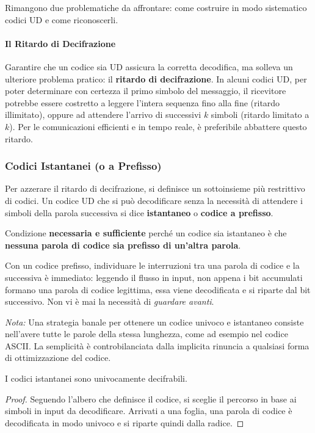 Rimangono due problematiche da affrontare: come costruire in modo sistematico codici UD e come riconoscerli.

\paragraph*{Il Ritardo di Decifrazione}
Garantire che un codice sia UD assicura la corretta decodifica, ma solleva un ulteriore problema pratico: il \textbf{ritardo di decifrazione}. In alcuni codici UD, per poter determinare con certezza il primo simbolo del messaggio, il ricevitore potrebbe essere costretto a leggere l'intera sequenza fino alla fine (ritardo illimitato), oppure ad attendere l'arrivo di successivi $k$ simboli (ritardo limitato a $k$). Per le comunicazioni efficienti e in tempo reale, è preferibile abbattere questo ritardo.

\subsubsection{Codici Istantanei (o a Prefisso)}
Per azzerare il ritardo di decifrazione, si definisce un sottoinsieme più restrittivo di codici. Un codice UD che si può decodificare senza la necessità di attendere i simboli della parola successiva si dice \textbf{istantaneo} o \textbf{codice a prefisso}.

Condizione \textbf{necessaria e sufficiente} perché un codice sia istantaneo è che \textbf{nessuna parola di codice sia prefisso di un'altra parola}.

Con un codice prefisso, individuare le interruzioni tra una parola di codice e la successiva è immediato: leggendo il flusso in input, non appena i bit accumulati formano una parola di codice legittima, essa viene decodificata e si riparte dal bit successivo. Non vi è mai la necessità di \textit{guardare avanti}.

\textit{Nota:} Una strategia banale per ottenere un codice univoco e istantaneo consiste nell'avere tutte le parole della stessa lunghezza, come ad esempio nel codice ASCII. La semplicità è controbilanciata dalla implicita rinuncia a qualsiasi forma di ottimizzazione del codice.
\begin{theorem}
    I codici istantanei sono univocamente decifrabili.
\end{theorem}
\begin{proof}
Seguendo l'albero che definisce il codice, si sceglie il percorso in base ai simboli in input da decodificare. Arrivati a una foglia, una parola di codice è decodificata in modo univoco e si riparte quindi dalla radice.
\end{proof}

